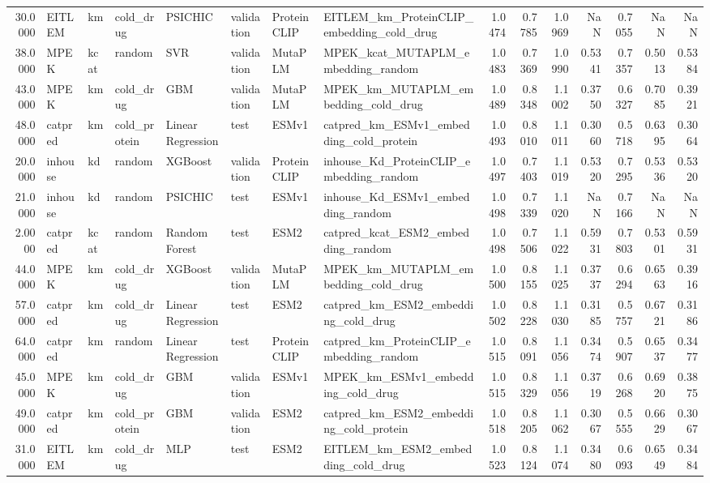\begin{tabular}{rlllllllrrrrrrr}
30.0000 & EITLEM & km & cold_drug & PSICHIC & validation & ProteinCLIP & EITLEM_km_ProteinCLIP_embedding_cold_drug & 1.0474 & 0.7785 & 1.0969 & NaN & 0.7055 & NaN & NaN \\
38.0000 & MPEK & kcat & random & SVR & validation & MutaPLM & MPEK_kcat_MUTAPLM_embedding_random & 1.0483 & 0.7369 & 1.0990 & 0.5341 & 0.7357 & 0.5013 & 0.5384 \\
43.0000 & MPEK & km & cold_drug & GBM & validation & MutaPLM & MPEK_km_MUTAPLM_embedding_cold_drug & 1.0489 & 0.8348 & 1.1002 & 0.3750 & 0.6327 & 0.7085 & 0.3921 \\
48.0000 & catpred & km & cold_protein & Linear Regression & test & ESMv1 & catpred_km_ESMv1_embedding_cold_protein & 1.0493 & 0.8010 & 1.1011 & 0.3060 & 0.5718 & 0.6395 & 0.3064 \\
20.0000 & inhouse & kd & random & XGBoost & validation & ProteinCLIP & inhouse_Kd_ProteinCLIP_embedding_random & 1.0497 & 0.7403 & 1.1019 & 0.5320 & 0.7295 & 0.5336 & 0.5320 \\
21.0000 & inhouse & kd & random & PSICHIC & test & ESMv1 & inhouse_Kd_ESMv1_embedding_random & 1.0498 & 0.7339 & 1.1020 & NaN & 0.7166 & NaN & NaN \\
2.0000 & catpred & kcat & random & Random Forest & test & ESM2 & catpred_kcat_ESM2_embedding_random & 1.0498 & 0.7506 & 1.1022 & 0.5931 & 0.7803 & 0.5301 & 0.5931 \\
44.0000 & MPEK & km & cold_drug & XGBoost & validation & MutaPLM & MPEK_km_MUTAPLM_embedding_cold_drug & 1.0500 & 0.8155 & 1.1025 & 0.3737 & 0.6294 & 0.6563 & 0.3916 \\
57.0000 & catpred & km & cold_drug & Linear Regression & test & ESM2 & catpred_km_ESM2_embedding_cold_drug & 1.0502 & 0.8228 & 1.1030 & 0.3185 & 0.5757 & 0.6721 & 0.3186 \\
64.0000 & catpred & km & random & Linear Regression & test & ProteinCLIP & catpred_km_ProteinCLIP_embedding_random & 1.0515 & 0.8091 & 1.1056 & 0.3474 & 0.5907 & 0.6537 & 0.3477 \\
45.0000 & MPEK & km & cold_drug & GBM & validation & ESMv1 & MPEK_km_ESMv1_embedding_cold_drug & 1.0515 & 0.8329 & 1.1056 & 0.3719 & 0.6268 & 0.6920 & 0.3875 \\
49.0000 & catpred & km & cold_protein & GBM & validation & ESM2 & catpred_km_ESM2_embedding_cold_protein & 1.0518 & 0.8205 & 1.1062 & 0.3067 & 0.5555 & 0.6629 & 0.3067 \\
31.0000 & EITLEM & km & cold_drug & MLP & test & ESM2 & EITLEM_km_ESM2_embedding_cold_drug & 1.0523 & 0.8124 & 1.1074 & 0.3480 & 0.6093 & 0.6549 & 0.3484 \\

\end{tabular}
